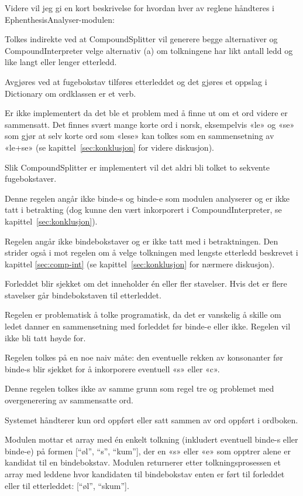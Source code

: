 Videre vil jeg gi en kort beskrivelse for hvordan hver av reglene håndteres i EphenthesisAnalyser-modulen: 
\begin{inparaenum}[ 1)]
\item Tolkes indirekte ved at CompoundSplitter vil generere begge alternativer og CompoundInterpreter velge alternativ (a) om tolkningene har likt antall ledd og like langt eller lenger etterledd.
\item Avgjøres ved at fugebokstav tilføres etterleddet og det gjøres et oppslag i Dictionary om ordklassen er et verb. 
\item Er ikke implementert da det ble et problem med å finne ut om et ord videre er sammensatt. Det finnes svært mange korte ord i norsk, eksempelvis «le» og «se» som gjør at selv korte ord som «lese» kan tolkes som en sammensetning av «le+se» (se kapittel~\ref{sec:konklusjon} for videre diskusjon). 
\item Slik CompoundSplitter er implementert vil det aldri bli tolket to sekvente fugebokstaver. 
\item Denne regelen angår ikke binde-s og binde-e som modulen analyserer og er ikke tatt i betrakting (dog kunne den vært inkorporert i CompoundInterpreter, se kapittel~\ref{sec:konklusjon}). 
\item Regelen angår ikke bindebokstaver og er ikke tatt med i betraktningen. Den strider også i mot regelen om å velge tolkningen med lengste etterledd beskrevet i kapittel \ref{sec:comp-int} (se kapittel~\ref{sec:konklusjon} for nærmere diskusjon). 
\item Forleddet blir sjekket om det inneholder én eller fler stavelser. Hvis det er flere stavelser går bindebokstaven til etterleddet. 
\item Regelen er problematisk å tolke programatisk, da det er vanskelig å skille om ledet danner en sammensetning med forleddet før binde-e eller ikke. Regelen vil ikke bli tatt høyde for. 
\item Regelen tolkes på en noe naiv måte: den eventuelle rekken av konsonanter før binde-s blir sjekket for å inkorporere eventuell «s» eller «c». 
\item Denne regelen tolkes ikke av samme grunn som regel tre og problemet med overgenerering av sammensatte ord. 
\item Systemet håndterer kun ord oppført eller satt sammen av ord oppført i ordboken.
\end{inparaenum}

Modulen mottar et array med én enkelt tolkning (inkludert eventuell binde-s eller binde-e) på formen [“øl”, “s”, “kum”], der en «s» eller «e» som opptrer alene er kandidat til en bindebokstav. Modulen returnerer etter tolkningsprosessen et array med leddene hvor kandidaten til bindebokstav enten er ført til forleddet eller til etterleddet: [“øl”, “skum”]. 

